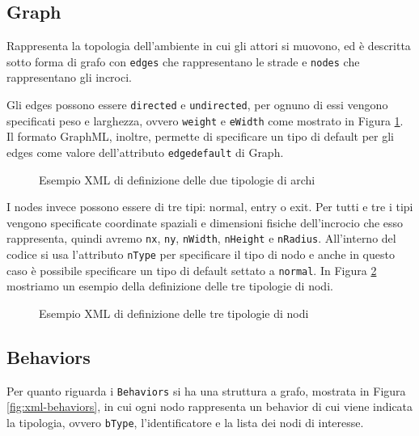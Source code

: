 \subsection{Graph} 

Rappresenta la topologia dell'ambiente in cui gli attori si muovono, ed è descritta sotto forma di grafo con \texttt{edges} che rappresentano le strade e \texttt{nodes} che rappresentano gli incroci.

Gli edges possono essere \texttt{directed} e \texttt{undirected}, per ognuno di essi vengono specificati peso e larghezza, ovvero \texttt{weight} e \texttt{eWidth} come mostrato in Figura \ref{fig:xml-edges}. Il formato GraphML, inoltre, permette di specificare un tipo di default per gli edges come valore dell'attributo \texttt{edgedefault} di Graph.

\begin{figure}[htbp]
\centering
\caption{Esempio XML di definizione delle due tipologie di archi}
\label{fig:xml-edges}
\end{figure}

I nodes invece possono essere di tre tipi: normal, entry o exit. Per tutti e tre i tipi vengono specificate coordinate spaziali e dimensioni fisiche dell'incrocio che esso rappresenta, quindi avremo \texttt{nx}, \texttt{ny}, \texttt{nWidth}, \texttt{nHeight} e \texttt{nRadius}. All'interno del codice si usa l'attributo \texttt{nType} per specificare il tipo di nodo e anche in questo caso è possibile specificare un tipo di default settato a \texttt{normal}. In Figura \ref{fig:xml-nodes} mostriamo un esempio della definizione delle tre tipologie di nodi.  

\begin{figure}[htbp]
\centering
\caption{Esempio XML di definizione delle tre tipologie di nodi}
\label{fig:xml-nodes}
\end{figure}


\subsection{Behaviors}

Per quanto riguarda i \texttt{Behaviors} si ha una struttura a grafo, mostrata in Figura \ref{fig:xml-behaviors}, in cui ogni nodo rappresenta un behavior di cui viene indicata la tipologia, ovvero \texttt{bType}, l'identificatore e la lista dei nodi di interesse.

